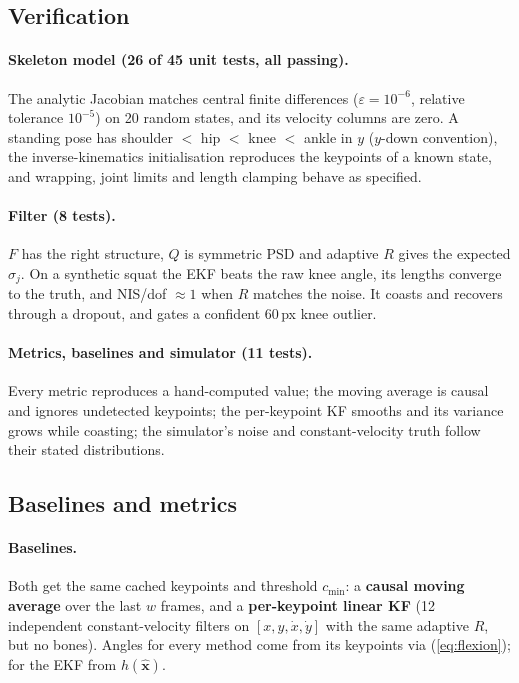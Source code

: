 \documentclass[12pt,a4paper]{article}
\begin{document}
\subsection{Verification}

\paragraph{Skeleton model (26 of 45 unit tests, all passing).} The analytic Jacobian matches central finite
differences ($\varepsilon=10^{-6}$, relative tolerance $10^{-5}$) on 20 random states, and its velocity
columns are zero. A standing pose has shoulder $<$ hip $<$ knee $<$ ankle in $y$ ($y$-down convention), the
inverse-kinematics initialisation reproduces the keypoints of a known state, and wrapping, joint limits and
length clamping behave as specified.

\paragraph{Filter (8 tests).} $F$ has the right structure, $Q$ is symmetric PSD and adaptive $R$ gives the
expected $\sigma_j$. On a synthetic squat the EKF beats the raw knee angle, its lengths converge to the truth,
and NIS/dof $\approx1$ when $R$ matches the noise. It coasts and recovers through a dropout, and gates a
confident 60\,px knee outlier.

\paragraph{Metrics, baselines and simulator (11 tests).} Every metric reproduces a hand-computed value; the
moving average is causal and ignores undetected keypoints; the per-keypoint KF smooths and its variance grows
while coasting; the simulator's noise and constant-velocity truth follow their stated distributions.

\subsection{Baselines and metrics}

\paragraph{Baselines.} Both get the same cached keypoints and threshold $c_{\min}$: a \textbf{causal moving
average} over the last $w$ frames, and a \textbf{per-keypoint linear KF} (12 independent constant-velocity
filters on $[x,y,\dot x,\dot y]$ with the same adaptive $R$, but no bones). Angles for every method come from
its keypoints via (\ref{eq:flexion}); for the EKF from $h(\hat{\mathbf{x}})$.
\end{document}
